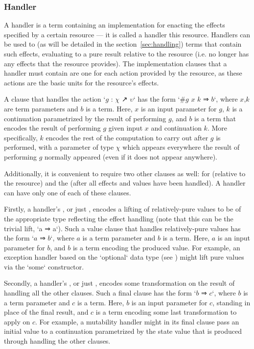 \subsubsection{Handler}

A handler is a term containing an implementation for enacting the effects specified by a certain resource --- it is called a handler  this resource.
Handlers can be used to  (as will be detailed in the section~\ref{sec:handling}) terms that contain such effects, evaluating to a pure result relative to the resource (i.e. no longer has any effects that the resource provides).
The implementation clauses that a handler must contain are one for each action provided by the resource, as these actions are the basic units for the resource's effects.

A clause that handles the action \code`$g$ : $χ$ ↗ $υ$` has the form
\code`#$g$ $x$ $k$ ⇒ $b$`,
where $x$,$k$ are term parameters and $b$ is a term.
Here,
$x$ is an input parameter for $g$,
$k$ is a continuation parametrized by the result of performing $g$, and
$b$ is a term that encodes the result of performing $g$ given input $x$ and continuation $k$.
More specifically, $k$ encodes the rest of the computation to carry out after $g$ is performed, with a parameter of type $χ$ which appears everywhere the result of performing $g$ normally appeared (even if it does not appear anywhere).

Additionally, it is convenient to require two other clauses as well: for  (relative to the resource) and the  (after all effects and values have been handled).
A handler can have only one of each of these clauses.

Firstly, a handler's , or just , encodes a lifting of relatively-pure values to be of the appropriate type reflecting the effect handling (note that this can be the trivial lift, \code`a ⇒ a`).
Such a value clause that handles relatively-pure values has the form
\code`$a$ ⇒ $b$`,
where $a$ is a term parameter and $b$ is a term.
Here,
$a$ is an input parameter for $b$, and
$b$ is a term encoding the produced value.
For example, an exception handler based on the \code`optional` data type (see \prelude{\LangA}) might lift pure values via the \code`some` constructor.

Secondly, a handler's , or just , encodes some transformation on the result of handling all the other clauses.
Such a final clause has the form
\code`$b$ ⇒ $c$`,
where $b$ is a term parameter and $c$ is a term.
Here,
$b$ is an input parameter for $c$, standing in place of the final result, and
$c$ is a term encoding some last transformation to apply on $c$.
For example, a mutability handler might in its final clause pass an initial value to a continuation parametrized by the state value that is produced through handling the other clauses.

